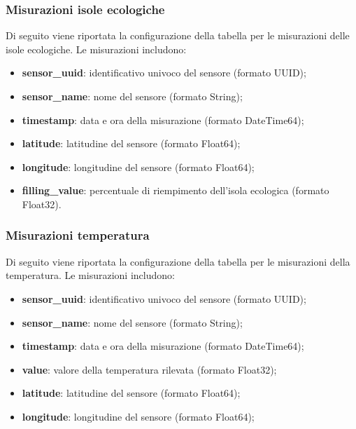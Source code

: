 \subsubsection{Misurazioni isole ecologiche}
Di seguito viene riportata la configurazione della tabella per le misurazioni delle isole ecologiche. Le misurazioni includono:
\begin{itemize}
	\item \textbf{sensor\_uuid}: identificativo univoco del sensore (formato UUID);
	\item \textbf{sensor\_name}: nome del sensore (formato String);
	\item \textbf{timestamp}: data e ora della misurazione (formato DateTime64);
	\item \textbf{latitude}: latitudine del sensore (formato Float64);
	\item \textbf{longitude}: longitudine del sensore (formato Float64);
	\item \textbf{filling\_value}: percentuale di riempimento dell'isola ecologica (formato Float32).
\end{itemize}
\subsubsection{Misurazioni temperatura}
Di seguito viene riportata la configurazione della tabella per le misurazioni della temperatura. Le misurazioni includono:
\begin{itemize}
	\item \textbf{sensor\_uuid}: identificativo univoco del sensore (formato UUID);
	\item \textbf{sensor\_name}: nome del sensore (formato String);
	\item \textbf{timestamp}: data e ora della misurazione (formato DateTime64);
	\item \textbf{value}: valore della temperatura rilevata (formato Float32);
	\item \textbf{latitude}: latitudine del sensore (formato Float64);
	\item \textbf{longitude}: longitudine del sensore (formato Float64);
\end{itemize}
